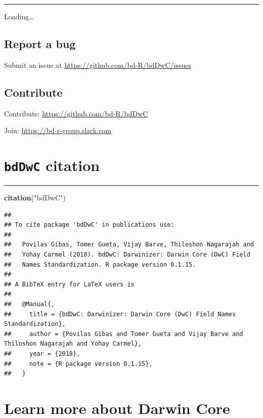 \documentclass[]{book}
\newenvironment{Shaded}{\begin{snugshade}}{\end{snugshade}}
\newcommand{\KeywordTok}[1]{\textcolor[rgb]{0.13,0.29,0.53}{\textbf{#1}}}
\newcommand{\StringTok}[1]{\textcolor[rgb]{0.31,0.60,0.02}{#1}}
\newcommand{\NormalTok}[1]{#1}
\theoremstyle{definition}
\theoremstyle{definition}
\theoremstyle{definition}
\theoremstyle{remark}
\begin{document}
\begin{center}\rule{0.5\linewidth}{\linethickness}\end{center}

Loading\ldots{}

\section{Report a bug}\label{report-a-bug}

Submit an issue at \url{https://github.com/bd-R/bdDwC/issues}

\section{Contribute}\label{contribute}

Contribute: \url{https://github.com/bd-R/bdDwC}

Join: \url{https://bd-r-group.slack.com}

\chapter{\texorpdfstring{\texttt{bdDwC}
citation}{bdDwC citation}}\label{bddwc-citation}

\begin{center}\rule{0.5\linewidth}{\linethickness}\end{center}

\begin{Shaded}
\begin{Highlighting}[]
\KeywordTok{citation}\NormalTok{(}\StringTok{"bdDwC"}\NormalTok{)}
\end{Highlighting}
\end{Shaded}

\begin{verbatim}
## 
## To cite package 'bdDwC' in publications use:
## 
##   Povilas Gibas, Tomer Gueta, Vijay Barve, Thiloshon Nagarajah and
##   Yohay Carmel (2018). bdDwC: Darwinizer: Darwin Core (DwC) Field
##   Names Standardization. R package version 0.1.15.
## 
## A BibTeX entry for LaTeX users is
## 
##   @Manual{,
##     title = {bdDwC: Darwinizer: Darwin Core (DwC) Field Names Standardization},
##     author = {Povilas Gibas and Tomer Gueta and Vijay Barve and Thiloshon Nagarajah and Yohay Carmel},
##     year = {2018},
##     note = {R package version 0.1.15},
##   }
\end{verbatim}

\hypertarget{learn-more-about-darwin-core}{\chapter{Learn more about
Darwin Core}\label{learn-more-about-darwin-core}}
\end{document}
